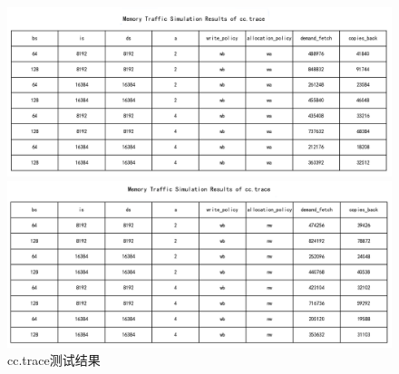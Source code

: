 \documentclass[12pt,hyperref,a4paper,UTF8]{ctexart}
\begin{document}
\begin{figure}[H]
    \centering
    \begin{minipage}[b]{0.45\textwidth}
        \centering
        \includegraphics[width=\textwidth]{./figures/fig/image41.png}
    \end{minipage}
    \hfill
    \begin{minipage}[b]{0.45\textwidth}
        \centering
        \includegraphics[width=\textwidth]{./figures/fig/image42.png}
    \end{minipage}
    \caption{cc.trace测试结果}
\end{figure}
\end{document}

